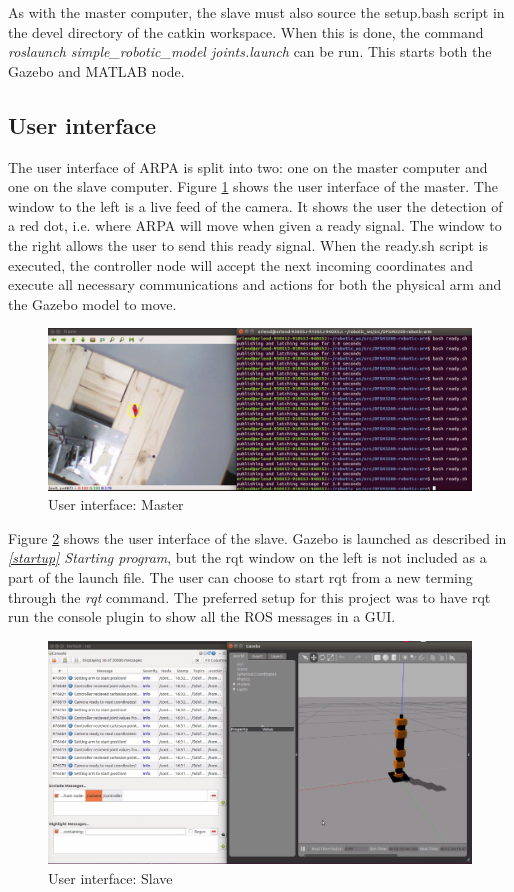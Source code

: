 \documentclass[11pt,a4paper]{report}
\begin{document}
	As with the master computer, the slave must also source the setup.bash script in the devel directory of the catkin workspace. When this is done, the command \textit{roslaunch simple\_robotic\_model joints.launch} can be run. This starts both the Gazebo and MATLAB node.
	
	\subsection{User interface}

	The user interface of ARPA is split into two: one on the master computer and one on the slave computer. Figure \ref{fig:ui-master} shows the user interface of the master. The window to the left is a live feed of the camera. It shows the user the detection of a red dot, i.e. where ARPA will move when given a ready signal. The window to the right allows the user to send this ready signal. When the ready.sh script is executed, the controller node will accept the next incoming coordinates and execute all necessary communications and actions for both the physical arm and the Gazebo model to move.
	
	\begin{figure}[H]
		\centering
		\includegraphics[width=0.95\linewidth]{../Diagrams/UI-master.png}
		\caption{User interface: Master}
		\label{fig:ui-master}
	\end{figure}
	
	Figure \ref{fig:ui-slave} shows the user interface of the slave. Gazebo is launched as described in \textit{\ref{startup} Starting program}, but the rqt window on the left is not included as a part of the launch file. The user can choose to start rqt from a new terming through the \textit{rqt} command. The preferred setup for this project was to have rqt run the console plugin to show all the ROS messages in a GUI.
	
	\begin{figure}[H]
		\centering
		\includegraphics[width=0.95\linewidth]{../Diagrams/UI-slave.png}
		\caption{User interface: Slave}
		\label{fig:ui-slave}
	\end{figure}
	
\end{document}
